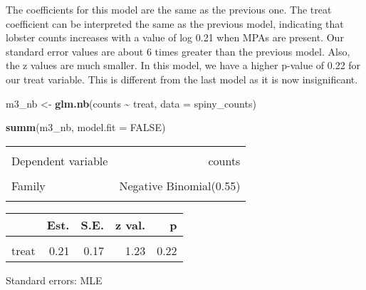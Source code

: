 \documentclass[
]{article}
\newenvironment{Shaded}{\begin{snugshade}}{\end{snugshade}}
\newcommand{\AttributeTok}[1]{\textcolor[rgb]{0.13,0.29,0.53}{#1}}
\newcommand{\ConstantTok}[1]{\textcolor[rgb]{0.56,0.35,0.01}{#1}}
\newcommand{\FunctionTok}[1]{\textcolor[rgb]{0.13,0.29,0.53}{\textbf{#1}}}
\newcommand{\NormalTok}[1]{#1}
\newcommand{\OtherTok}[1]{\textcolor[rgb]{0.56,0.35,0.01}{#1}}
\newcommand{\SpecialCharTok}[1]{\textcolor[rgb]{0.81,0.36,0.00}{\textbf{#1}}}
\begin{document}
The coefficients for this model are the same as the previous one. The
treat coefficient can be interpreted the same as the previous model,
indicating that lobster counts increases with a value of log 0.21 when
MPAs are present. Our standard error values are about 6 times greater
than the previous model. Also, the z values are much smaller. In this
model, we have a higher p-value of 0.22 for our treat variable. This is
different from the last model as it is now insignificant.

\begin{Shaded}
\begin{Highlighting}[]
\NormalTok{m3\_nb }\OtherTok{\textless{}{-}} \FunctionTok{glm.nb}\NormalTok{(counts }\SpecialCharTok{\textasciitilde{}}\NormalTok{ treat, }\AttributeTok{data =}\NormalTok{ spiny\_counts)}

\FunctionTok{summ}\NormalTok{(m3\_nb, }\AttributeTok{model.fit =} \ConstantTok{FALSE}\NormalTok{)}
\end{Highlighting}
\end{Shaded}

\begin{table}[!h]
\centering
\begin{tabular}{lr}
\toprule
\cellcolor{gray!10}{Observations} & \cellcolor{gray!10}{252}\\
Dependent variable & counts\\
\cellcolor{gray!10}{Type} & \cellcolor{gray!10}{Generalized linear model}\\
Family & Negative Binomial(0.55)\\
\cellcolor{gray!10}{Link} & \cellcolor{gray!10}{log}\\
\bottomrule
\end{tabular}
\end{table}  \begin{table}[!h]
\centering
\begin{threeparttable}
\begin{tabular}{lrrrr}
\toprule
  & Est. & S.E. & z val. & p\\
\midrule
\cellcolor{gray!10}{(Intercept)} & \cellcolor{gray!10}{3.12} & \cellcolor{gray!10}{0.12} & \cellcolor{gray!10}{26.40} & \cellcolor{gray!10}{0.00}\\
treat & 0.21 & 0.17 & 1.23 & 0.22\\
\bottomrule
\end{tabular}
\begin{tablenotes}
\item Standard errors: MLE
\end{tablenotes}
\end{threeparttable}
\end{table}
\end{document}
